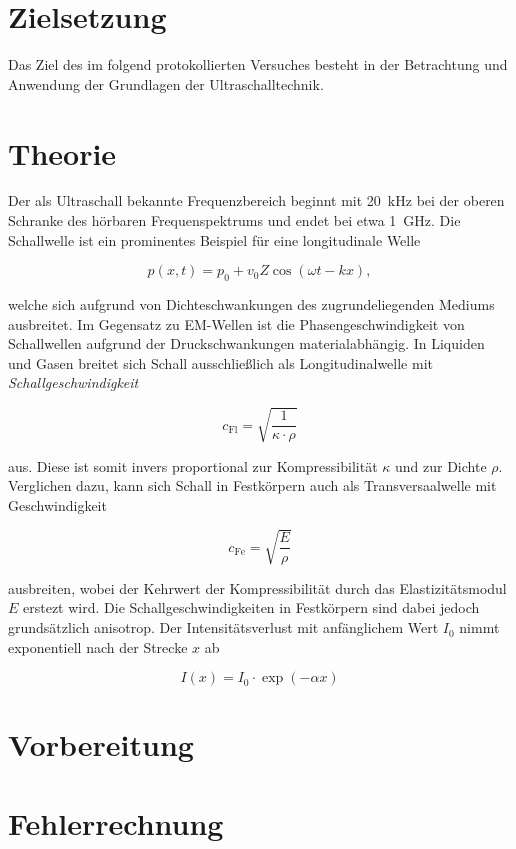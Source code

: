



\section{Zielsetzung}

Das Ziel des im folgend protokollierten Versuches besteht in der Betrachtung und Anwendung der Grundlagen der 
Ultraschalltechnik.

\section{Theorie}
\label{sec:Theorie}

Der als Ultraschall bekannte Frequenzbereich beginnt mit \qty{20}{\kilo\hertz} bei der oberen Schranke des hörbaren 
Frequenspektrums und endet bei etwa \qty{1}{\giga\hertz}. Die Schallwelle ist ein prominentes Beispiel für eine longitudinale 
Welle 

\begin{equation*}
    p\left(x,t\right) = p_0 + v_0Z\cos\left(\omega{}t - kx\right),
\end{equation*}

\noindent welche sich aufgrund von Dichteschwankungen des zugrundeliegenden Mediums ausbreitet. Im Gegensatz zu EM-Wellen ist 
die Phasengeschwindigkeit von Schallwellen aufgrund der Druckschwankungen materialabhängig. In Liquiden und Gasen breitet sich 
Schall ausschließlich als Longitudinalwelle mit \emph{Schallgeschwindigkeit}

\begin{equation*}
    c_\text{Fl} = \sqrt{\frac{1}{\kappa\cdot\rho}}
\end{equation*}

aus. Diese ist somit invers proportional zur Kompressibilität $\kappa$ und zur Dichte $\rho$. Verglichen dazu, kann sich Schall 
in Festkörpern auch als Transversaalwelle mit Geschwindigkeit 

\begin{equation*}
        c_\text{Fe} = \sqrt{\frac{E}{\rho}}
\end{equation*}

\noindent ausbreiten, wobei der Kehrwert der Kompressibilität durch das Elastizitätsmodul $E$ erstezt wird. Die Schallgeschwindigkeiten
in Festkörpern sind dabei jedoch grundsätzlich anisotrop. Der Intensitätsverlust mit anfänglichem Wert $I_0$ nimmt 
exponentiell nach der Strecke $x$ ab 

\begin{equation*}
    I(x) = I_0\cdot\exp{}\left(-\alpha{}x\right)
\end{equation*}

\section{Vorbereitung}


\section{Fehlerrechnung}
